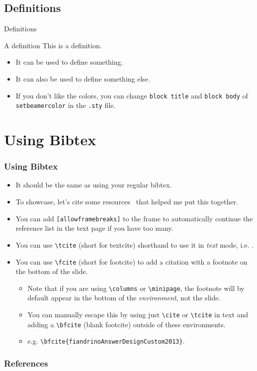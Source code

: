 \documentclass[
	10pt, %
	aspectratio=169, %
]{beamer}
\begin{document}
\subsection{Definitions}
\begin{frame}{Definitions}
	\begin{definition}{A definition}
		This is a definition.
		\begin{itemize}
			\item It can be used to define something.
			\item It can also be used to define something else.
			\item If you don't like the colors, you can change \texttt{block title} and  \texttt{block body} of \texttt{setbeamercolor} in the \texttt{.sty} file.\end{itemize}
	\end{definition}
\end{frame}



\section{Using Bibtex}
\begin{frame}
	\frametitle{Using Bibtex}
	\begin{itemize}
		\item It should be the same as using your regular bibtex.
		\item To showcase, let's cite some resources~\cite{anglimAnswerImageFull2010,fiandrinoAnswerDesignCustom2013,kormyloAnswerMakeTikz2017} that helped me put this together.
		\item You can add \texttt{[allowframebreaks]} to the frame to automatically continue the reference list in the text page if you have too many.
		\item You can use \texttt{\textbackslash tcite} (short for textcite) shorthand to use it in \textit{text} mode, i.e. .
		\item You can use \texttt{\textbackslash fcite} (short for footcite) to add a citation with a footnote on the bottom of the slide.
		      \begin{itemize}
			      \item Note that if you are using \texttt{\textbackslash columns} or \texttt{\textbackslash minipage}, the footnote will by default appear in the bottom of the \textit{environment}, not the slide.
			      \item You can manually escape this by using just \texttt{\textbackslash cite} or \texttt{\textbackslash tcite} in text and adding a \texttt{\textbackslash bfcite} (blank footcite) outside of these environments.
			      \item e.g. \texttt{\textbackslash bfcite\{fiandrinoAnswerDesignCustom2013\}}.
		      \end{itemize}
	\end{itemize}
\end{frame}

\begin{frame}[allowframebreaks]
	\frametitle{References}
	\printbibliography
\end{frame}
\end{document}
